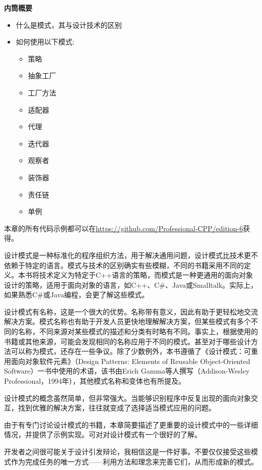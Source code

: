 \noindent
\textbf{内筒概要}

\begin{itemize}
\item
什么是模式，其与设计技术的区别

\item
如何使用以下模式:

\begin{itemize}
\item
策略

\item
抽象工厂

\item
工厂方法

\item
适配器

\item
代理

\item
迭代器

\item
观察者

\item
装饰器

\item
责任链

\item
单例
\end{itemize}
\end{itemize}

本章的所有代码示例都可以在\url{https://github.com/Professional-CPP/edition-6}获得。

设计模式是一种标准化的程序组织方法，用于解决通用问题，设计模式比技术更不依赖于特定的语言。模式与技术的区别确实有些模糊，不同的书籍采用不同的定义。本书将技术定义为特定于C++语言的策略，而模式是一种更通用的面向对象设计的策略，适用于面向对象的语言，如C++、C\#、Java或Smalltalk。实际上，如果熟悉C\#或Java编程，会更了解这些模式。

设计模式有名称，这是一个很大的优势。名称带有意义，因此有助于更轻松地交流解决方案。模式名称也有助于开发人员更快地理解解决方案，但某些模式有多个不同的名称，不同来源对某些模式的描述和分类有时略有不同。事实上，根据使用的书籍或其他来源，可能会发现相同的名称应用于不同的模式。甚至对于哪些设计方法可以称为模式，还存在一些争议。除了少数例外，本书遵循了《设计模式：可重用面向对象软件元素》（Design Patterns: Elements of Reusable Object-Oriented Software）一书中使用的术语，该书由Erich Gamma等人撰写（Addison-Wesley Professional，1994年），其他模式名称和变体也有所提及。

设计模式的概念虽然简单，但非常强大。当能够识别程序中反复出现的面向对象交互，找到优雅的解决方案，往往就变成了选择适当模式应用的问题。

由于有专门讨论设计模式的书籍，本章简要描述了更重要的设计模式中的一些详细情况，并提供了示例实现。可对对设计模式有一个很好的了解。

开发者之间很可能关于设计引发辩论，我相信这是一件好事。不要仅仅接受这些模式作为完成任务的唯一方式——利用方法和理念来完善它们，从而形成新的模式。









